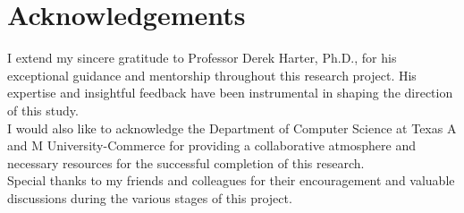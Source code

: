 \chapter*{\center \Large  Acknowledgements}
I extend my sincere gratitude to Professor Derek Harter, Ph.D., for his exceptional guidance and mentorship throughout this research project. His expertise and insightful feedback have been instrumental in shaping the direction of this study.\\

I would also like to acknowledge the Department of Computer Science at Texas A and M University-Commerce for providing a collaborative atmosphere and necessary resources for the successful completion of this research.\\

Special thanks to my friends and colleagues for their encouragement and valuable discussions during the various stages of this project.

